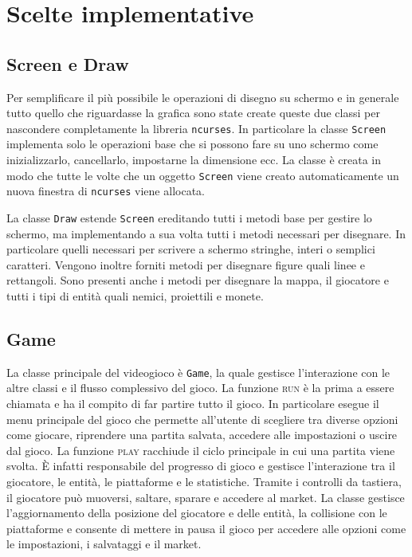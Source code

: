\documentclass[a4paper]{article}
\begin{document}
\section{Scelte implementative}
\subsection{Screen e Draw}
Per semplificare il più possibile le operazioni di disegno su schermo e in 
generale tutto quello che riguardasse la grafica sono state create queste due
classi per nascondere completamente la libreria \texttt{ncurses}. In particolare
la classe \texttt{Screen} implementa solo le operazioni base che si possono fare
su uno schermo come inizializzarlo, cancellarlo, impostarne la dimensione ecc.
La classe è creata in modo che tutte le volte che un oggetto \texttt{Screen} 
viene creato automaticamente un nuova finestra di \texttt{ncurses} viene 
allocata.

La classe \texttt{Draw} estende \texttt{Screen} ereditando tutti i metodi base
per gestire lo schermo, ma implementando a sua volta tutti i metodi necessari 
per disegnare. In particolare quelli necessari per scrivere a schermo stringhe, 
interi o semplici caratteri. Vengono inoltre forniti metodi per disegnare figure 
quali linee e rettangoli. Sono presenti anche i metodi per disegnare la mappa, 
il giocatore e tutti i tipi di entità quali nemici, proiettili e monete.

\subsection{Game}
La classe principale del videogioco è \texttt{Game}, la quale gestisce 
l’interazione con le altre classi e il flusso complessivo del gioco. La funzione 
\textsc{run} è la prima a essere chiamata e ha il compito di far partire tutto
il gioco. In particolare esegue il menu principale del gioco che permette 
all’utente di scegliere tra diverse opzioni come giocare, riprendere una partita salvata, accedere alle impostazioni o uscire dal gioco. La funzione 
\textsc{play} racchiude il ciclo principale in cui una partita viene svolta. È
infatti responsabile del progresso di gioco e gestisce l’interazione tra il 
giocatore, le entità, le piattaforme e le statistiche. Tramite i controlli da 
tastiera, il giocatore può muoversi, saltare, sparare e accedere al market. 
La classe gestisce l’aggiornamento della posizione del giocatore e delle entità, la collisione con le piattaforme e consente di mettere in pausa il gioco per 
accedere alle opzioni come le impostazioni, i salvataggi e il market.
\end{document}
